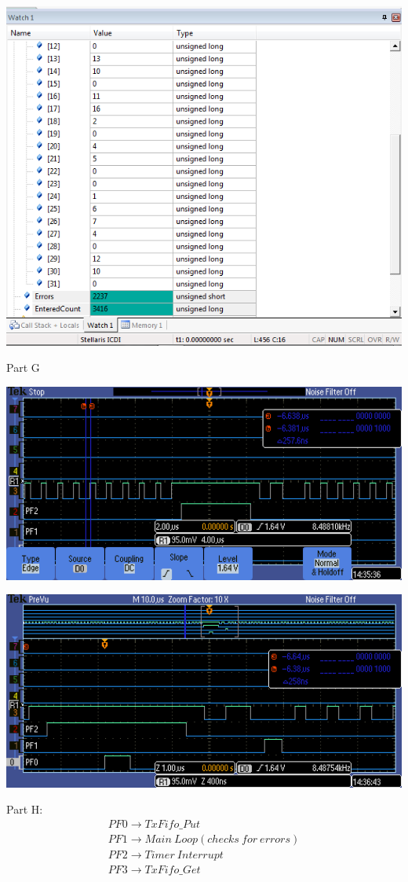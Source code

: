 \documentclass[11pt]{article}
\begin{document}
  \centerline{\includegraphics[width=1\textwidth]{badCritSec}\\[.25in]}
  Part G\\

  \centerline{\includegraphics[width=1\textwidth]{TEK00009}\\[.25in]}
  \centerline{\includegraphics[width=1\textwidth]{TEK00013}\\[.25in]}
  Part H:\\
  \begin{gather*}
  PF0 \to TxFifo\_ Put\\
	PF1 \to Main\: Loop (checks\: for\: errors)\\
	PF2 \to Timer\: Interrupt\\
	PF3 \to TxFifo\_Get
\end{gather*}
\end{document}
